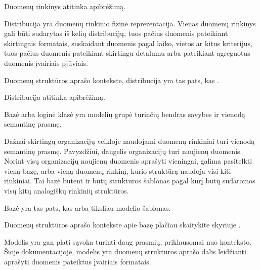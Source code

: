 \documentclass[letterpaper,10pt,lithuanian]{sphinxmanual}
\begin{document}
\begin{description}
\sphinxAtStartPar
Duomenų rinkinys atitinka  apibrėžimą.

\sphinxAtStartPar
Distribucija yra duomenų rinkinio fizinė reprezentacija. Vienas duomenų
rinkinys gali būti sudarytas iš kelių distribucijų, tuos pačius duomenis
pateikiant skirtingais formatais, suskaidant duomenis pagal laiko,
vietos ar kitus kriterijus, tuos pačius duomenis pateikiant skirtingu
detalumu arba pateikiant agreguotus duomenis įvairiais pjūviais.

\sphinxAtStartPar
Duomenų struktūros aprašo kontekste, distribucija yra tas pats, kas
.

\sphinxAtStartPar
Distribucija atitinka  apibrėžimą.

\sphinxAtStartPar
Bazė arba loginė klasė yra modelių grupė turinčių bendras savybes ir
vienodą semantinę prasmę.

\sphinxAtStartPar
Dažnai skirtingų organizacijų veikloje naudojami duomenų rinkiniai turi
vienodą semantinę prasmę. Pavyzdžiui, daugelis organizacijų turi
naujienų duomenis. Norint visų organizacijų naujienų duomenis
aprašyti vieningai, galima pasitelkti vieną bazę, arba vieną duomenų
rinkinį, kurio struktūrą naudoja visi kiti rinkiniai. Tai bazė būtent
ir būtų struktūros šablonas pagal kurį būtų sudaromos visų kitų
analogiškų rinkinių struktūros.

\sphinxAtStartPar
Bazė yra tas pats, kas {\hyperref[\detokenize{savokos:term-modelis}]{}} arba tiksliau modelio šablonas.

\sphinxAtStartPar
Duomenų struktūros aprašo kontekste apie bazę plačiau skaitykite
skyriuje {\hyperref[\detokenize{dimensijos:base}]{}}.

\sphinxAtStartPar
Modelis yra gan plati sąvoka turinti daug prasmių, priklausomai nuo
konteksto. Šioje dokumentacijoje, modelis yra duomenų struktūros
aprašo dalis leidžianti aprašyti duomenis pateiktus įvairiais
formatais.


\end{description}
\end{document}

